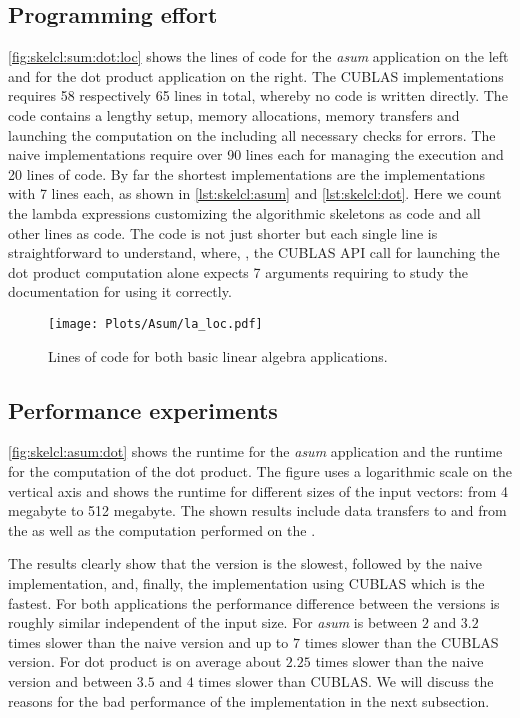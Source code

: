\subsection*{Programming effort}
\autoref{fig:skelcl:sum:dot:loc} shows the lines of code for the \emph{asum} application on the left and for the dot product application on the right.
The CUBLAS implementations requires 58 respectively 65 lines in total, whereby no \GPU code is written directly.
The code contains a lengthy setup, memory allocations, memory transfers and launching the computation on the \GPU including all necessary checks for errors.
The naive \OpenCL implementations require over 90 lines each for managing the \GPU execution and 20 lines of \GPU code.
By far the shortest implementations are the \SkelCL implementations with 7 lines each, as shown in \autoref{lst:skelcl:asum} and \autoref{lst:skelcl:dot}.
Here we count the lambda expressions customizing the algorithmic skeletons as \GPU code and all other lines as \CPU code.
The code is not just shorter but each single line is straightforward to understand, where, \eg,  the CUBLAS API call for launching the dot product computation alone expects 7 arguments requiring to study the documentation for using it correctly.

\begin{figure}
  \centering
  \texttt{[image: Plots/Asum/la\_loc.pdf]}
  \caption{Lines of code for both basic linear algebra applications.}
  \label{fig:skelcl:sum:dot:loc}
\end{figure}

\subsection*{Performance experiments}
\autoref{fig:skelcl:asum:dot} shows the runtime for the \emph{asum} application and the runtime for the computation of the dot product.
The figure uses a logarithmic scale on the vertical axis and shows the runtime for different sizes of the input vectors: from 4 megabyte to 512 megabyte.
The shown results include data transfers to and from the \GPU as well as the computation performed on the \GPU.

The results clearly show that the \SkelCL version is the slowest, followed by the naive \OpenCL implementation, and, finally, the implementation using CUBLAS which is the fastest.
For both applications the performance difference between the versions is roughly similar independent of the input size.
For \emph{asum} \SkelCL is between $2$ and $3.2$ times slower than the naive \OpenCL version and up to $7$ times slower than the CUBLAS version.
For dot product \SkelCL is on average about $2.25$ times slower than the naive \OpenCL version and between $3.5$ and $4$ times slower than CUBLAS.
We will discuss the reasons for the bad performance of the \SkelCL implementation in the next subsection.

